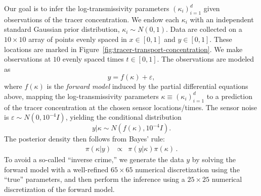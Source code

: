 Our goal is to infer the log-transmissivity parameters $(\kappa_i)_{i=1}^d$ given observations of the tracer concentration. We endow each $\kappa_i$  with an independent standard Gaussian prior distribution, $\kappa_i \sim N(0, 1)$. 
%
%
Data are collected on a $10 \times 10$ array of points evenly spaced in $x \in [0, 1]$ and $y \in [0, 1]$. These locations are marked in Figure~\ref{fig:tracer-transport-concentration}. We make observations at $10$ evenly spaced times $t \in [0, 1]$. 
The observations are modeled as
\begin{equation}
    y = f(\kappa) + \varepsilon,
\end{equation}
where $f(\kappa)$ is the \textit{forward model} induced by the partial differential equations above, mapping the log-transmissivity parameters $\kappa \equiv (\kappa_i)_{i=1}^d$ to a prediction of the tracer concentration at the chosen sensor locations/times. The sensor noise is $\varepsilon \sim N(0, 10^{-4} {I})$, yielding the conditional distribution 
\begin{equation}
y \vert \kappa \sim  N(f(\kappa), 10^{-4} I).
\end{equation}
The posterior density then follows from Bayes' rule:
\begin{eqnarray}
    \pi(\kappa \vert y) &\propto& \pi(y \vert \kappa) \pi(\kappa) \, .
    \label{eq:tracer-posterior}
\end{eqnarray}
To avoid a so-called ``inverse crime,''  we generate the data $y$ by solving the forward model with a well-refined $65 \times 65$ numerical discretization using the ``true'' parameters, and then perform the inference using a $25 \times 25$ numerical discretization of the forward model.

